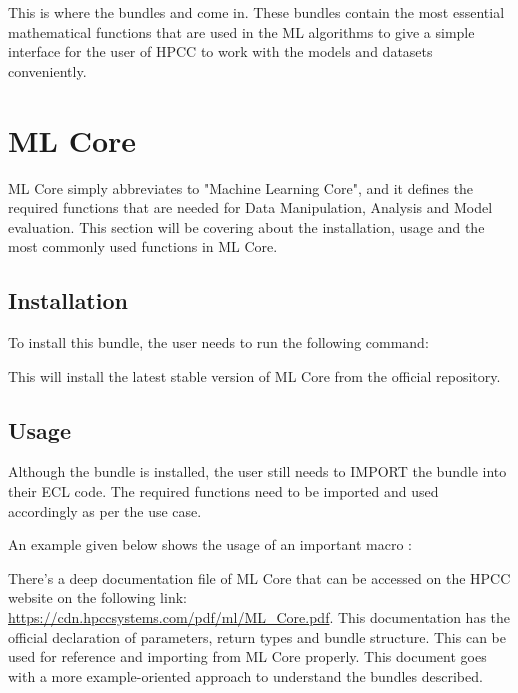 This is where the bundles  and  come in. These bundles contain the most essential mathematical functions that are used in the ML algorithms to give a simple interface for the user of HPCC to work with the models and datasets conveniently.

\section{ML Core}\label{sec:mlcore}

ML Core simply abbreviates to "Machine Learning Core", and it defines the required functions that are needed for Data Manipulation, Analysis and Model evaluation. This section will be covering about the installation, usage and the most commonly used functions in ML Core.

\subsection{Installation}

To install this bundle, the user needs to run the following command:



This will install the latest stable version of ML Core from the official repository.

\subsection{Usage}

Although the bundle is installed, the user still needs to IMPORT the bundle into their ECL code. The required functions need to be imported and used accordingly as per the use case.

An example given below shows the usage of an important macro \textbf{}:



There's a deep documentation file of ML Core that can be accessed on the HPCC website on the following link: \url{https://cdn.hpccsystems.com/pdf/ml/ML\_Core.pdf}. This documentation has the official declaration of parameters, return types and bundle structure. This can be used for reference and importing from ML Core properly. This document goes with a more example-oriented approach to understand the bundles described.

